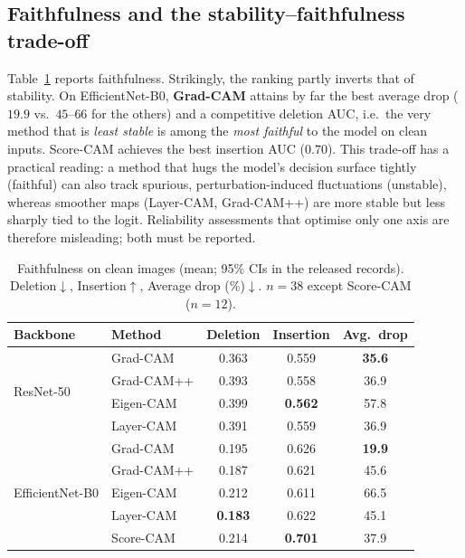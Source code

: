 \documentclass[runningheads]{llncs}
\begin{document}
\subsection{Faithfulness and the stability--faithfulness trade-off}
Table~\ref{tab:faith} reports faithfulness. Strikingly, the ranking partly
inverts that of stability. On EfficientNet-B0, \textbf{Grad-CAM} attains by far
the best average drop ($19.9$ vs.\ $45$--$66$ for the others) and a competitive
deletion AUC, i.e.\ the very method that is \emph{least stable} is among the
\emph{most faithful} to the model on clean inputs. Score-CAM achieves the best
insertion AUC ($0.70$). This trade-off has a practical reading: a method that
hugs the model's decision surface tightly (faithful) can also track spurious,
perturbation-induced fluctuations (unstable), whereas smoother maps (Layer-CAM,
Grad-CAM++) are more stable but less sharply tied to the logit. Reliability
assessments that optimise only one axis are therefore misleading; both must be
reported.

\begin{table}[t]
\centering
\small
\setlength{\tabcolsep}{5pt}
\caption{Faithfulness on clean images (mean; 95\% CIs in the released records).
Deletion$\downarrow$, Insertion$\uparrow$, Average drop (\%)$\downarrow$.
$n{=}38$ except Score-CAM ($n{=}12$).}
\label{tab:faith}
\begin{tabular}{llccc}
\toprule
Backbone & Method & Deletion & Insertion & Avg.\ drop \\
\midrule
\multirow{4}{*}{ResNet-50}
 & Grad-CAM   & 0.363 & 0.559 & \textbf{35.6} \\
 & Grad-CAM++ & 0.393 & 0.558 & 36.9 \\
 & Eigen-CAM  & 0.399 & \textbf{0.562} & 57.8 \\
 & Layer-CAM  & 0.391 & 0.559 & 36.9 \\
\midrule
\multirow{5}{*}{EfficientNet-B0}
 & Grad-CAM   & 0.195 & 0.626 & \textbf{19.9} \\
 & Grad-CAM++ & 0.187 & 0.621 & 45.6 \\
 & Eigen-CAM  & 0.212 & 0.611 & 66.5 \\
 & Layer-CAM  & \textbf{0.183} & 0.622 & 45.1 \\
 & Score-CAM  & 0.214 & \textbf{0.701} & 37.9 \\
\bottomrule
\end{tabular}
\end{table}
\end{document}
